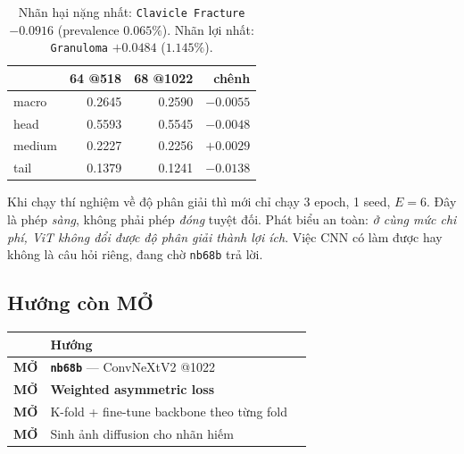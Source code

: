 \documentclass[11pt,a4paper]{article}
\newcommand{\MO}{\textbf{\textcolor{green!42!black}{MỞ}}}
\newcommand{\code}[1]{\texttt{\small #1}}
\begin{document}
\begin{table}[h]
\centering
\small
\begin{tabular}{@{}lrrr@{}}
\toprule
& \textbf{64 @518} & \textbf{68 @1022} & \textbf{chênh} \\
\midrule
macro  & 0.2645 & 0.2590 & $-0.0055$ \\
head   & 0.5593 & 0.5545 & $-0.0048$ \\
medium & 0.2227 & 0.2256 & $\mathbf{+0.0029}$ \\
tail   & 0.1379 & 0.1241 & $\mathbf{-0.0138}$ \\
\bottomrule
\end{tabular}
\caption{Nhãn hại nặng nhất: \code{Clavicle Fracture} $-0.0916$ (prevalence $0.065\%$).
Nhãn lợi nhất: \code{Granuloma} $+0.0484$ ($1.145\%$).}
\end{table}

Khi chạy thí nghiệm về độ phân giải thì mới chỉ chạy 3 epoch, 1 seed, $E=6$.
Đây là phép \emph{sàng}, không phải phép \emph{đóng} tuyệt đối. Phát biểu an toàn: \emph{ở
cùng mức chi phí, ViT không đổi được độ phân giải thành lợi ích}. Việc CNN có làm được hay
không là câu hỏi riêng, đang chờ \code{nb68b} trả lời.

\subsection{Hướng còn MỞ}

\begin{center}
\begin{tabular}{@{}l l r@{}}
\toprule
& \textbf{Hướng} \\
\midrule
\MO & \textbf{\code{nb68b}} --- ConvNeXtV2 @1022  \\
\MO & \textbf{Weighted asymmetric loss}  \\
\MO & K-fold + fine-tune backbone theo từng fold  \\
\MO & Sinh ảnh diffusion cho nhãn hiếm \\
\bottomrule
\end{tabular}
\end{center}
\end{document}
